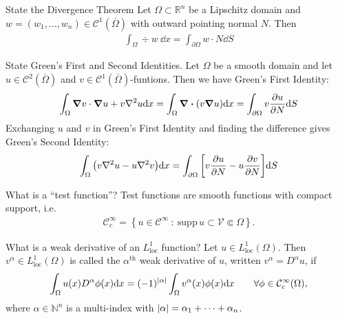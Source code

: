 \documentclass[avery5388,grid,frame]{flashcards}
\newcommand{\supp}{\mathrm{supp}\,}
\def\Rl{\mathbb{R}}
\begin{document}


\begin{flashcard}
    {State the Divergence Theorem}
    Let $\Omega \subset \Rl^n$ be a Lipschitz domain and $w = (w_1, \dots, w_n) \in \mathcal{C}^1(\overline{\Omega})$ with outward pointing normal $N$.  Then
    \begin{align*}
        \int_\Omega \div w\ \dd x = \int_{\partial \Omega} w \cdot N \dd S
    \end{align*}
\end{flashcard}

\begin{flashcard}
    {State Green's First and Second Identities.}
    Let $\Omega$ be a smooth domain and let $u \in \mathcal{C}^2(\overline{\Omega})$ and $v \in \mathcal{C}^1(\overline{\Omega})$-funtions.  Then we have Green's First Identity:
    \begin{align*}
        \int_\Omega \grad v \cdot \grad u + v\laplacian u \dd x = \int_\Omega \div\qty(v\grad u)\dd x = \int_{\partial \Omega} v \frac{\partial u}{\partial N}\dd S
    \end{align*}
    Exchanging $u$ and $v$ in Green's First Identity and finding the difference gives Green's Second Identity:
    \begin{align*}
        \int_\Omega \qty(v \laplacian u - u\laplacian v)\dd x = \int_{\partial \Omega}\qty[v\frac{\partial u}{\partial N} - u \frac{\partial v}{\partial N}]\dd S
    \end{align*}
\end{flashcard}

\begin{flashcard}
    {What is a ``test function''?}
    Test functions are smooth functions with compact support, i.e.
    \begin{align*}
        \mathcal{C}_c^\infty = \left\{u \in \mathcal{C}^\infty\ :\ \supp u \subset \mathcal{V} \Subset \Omega\right\}.
    \end{align*}
\end{flashcard}

\begin{flashcard}
    {What is a weak derivative of an $L^1_{\text{loc}}$ function?}
    Let $u \in L^1_{\text{loc}}(\Omega)$.  Then $v^\alpha \in L^1_\text{loc}(\Omega)$ is called the $\alpha^\text{th}$ weak derivative of $u$, written $v^\alpha = D^\alpha u$, if
    \begin{align*}
        \int_\Omega u(x) D^\alpha \phi(x) \dd x = (-1)^{\abs{\alpha}}\int_\Omega  v^\alpha(x)\phi(x)\dd x \qquad \forall \phi \in \mathcal{C}_c^\infty(\Omega),
    \end{align*}
    where $\alpha \in \mathbb{N}^n$ is a multi-index with $\abs{\alpha} = \alpha_1 + \dots + \alpha_n$.
\end{flashcard}
\end{document}
